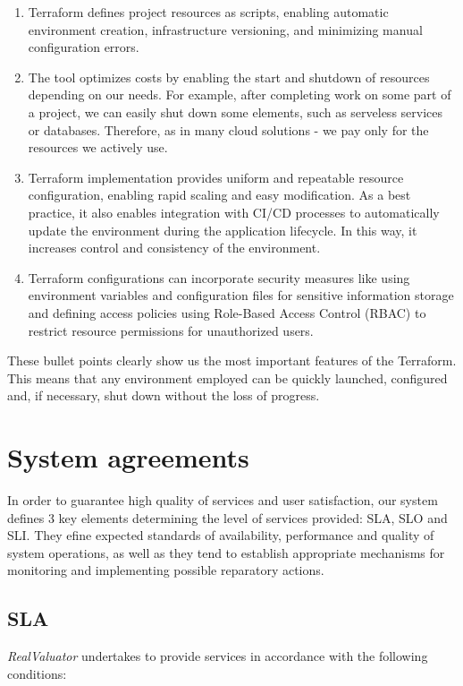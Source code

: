\documentclass{article}
\begin{document}
\begin{enumerate}
    \item Terraform defines project resources as scripts, enabling automatic environment creation, infrastructure versioning, and minimizing manual configuration errors.
    \item The tool optimizes costs by enabling the start and shutdown of resources depending on our needs. For example, after completing work on some part of a project, we can easily shut down some elements, such as serveless services or databases. Therefore, as in many cloud solutions - we pay only for the resources we actively use. 
    \item Terraform implementation provides uniform and repeatable resource configuration, enabling rapid scaling and easy modification. As a best practice, it also enables integration with CI/CD processes to automatically update the environment during the application lifecycle. In this way, it increases control and consistency of the environment.
    \item Terraform configurations can incorporate security measures like using environment variables and configuration files for sensitive information storage and defining access policies using Role-Based Access Control (RBAC) to restrict resource permissions for unauthorized users.
\end{enumerate}

These bullet points clearly show us the most important features of the Terraform. This means that any environment employed can be quickly launched, configured and, if necessary, shut down without the loss of progress.  

\section{System agreements}

In order to guarantee high quality of services and user satisfaction, our system defines 3 key elements determining the level of services provided: SLA, SLO and SLI. They efine expected standards of availability, performance and quality of system operations, as well as they tend to establish appropriate mechanisms for monitoring and implementing possible reparatory actions.

\subsection{SLA}
\textit{RealValuator} undertakes to provide services in accordance with the following conditions:
\end{document}
